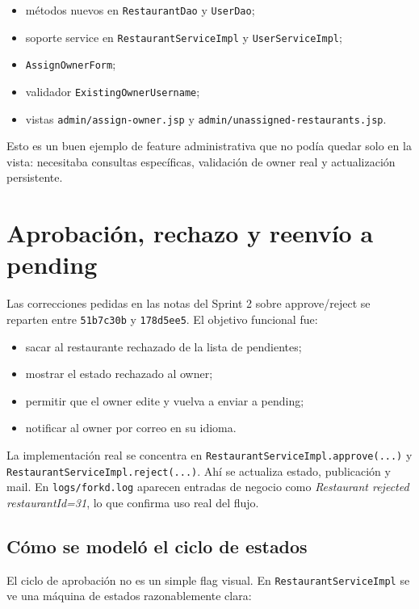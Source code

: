 \documentclass[11pt,a4paper]{report}
\newcommand{\commit}[1]{\texttt{#1}}
\newcommand{\code}[1]{\nolinkurl{#1}}
\begin{document}
\begin{itemize}
  \item m\'etodos nuevos en \code{RestaurantDao} y \code{UserDao};
  \item soporte service en \code{RestaurantServiceImpl} y \code{UserServiceImpl};
  \item \code{AssignOwnerForm};
  \item validador \code{ExistingOwnerUsername};
  \item vistas \code{admin/assign-owner.jsp} y \code{admin/unassigned-restaurants.jsp}.
\end{itemize}

Esto es un buen ejemplo de feature administrativa que no pod\'ia quedar solo en la vista: necesitaba consultas espec\'ificas, validaci\'on de owner real y actualizaci\'on persistente.

\section{Aprobaci\'on, rechazo y reenv\'io a pending}

Las correcciones pedidas en las notas del Sprint 2 sobre approve/reject se reparten entre \commit{51b7c30b} y \commit{178d5ee5}. El objetivo funcional fue:

\begin{itemize}
  \item sacar al restaurante rechazado de la lista de pendientes;
  \item mostrar el estado rechazado al owner;
  \item permitir que el owner edite y vuelva a enviar a pending;
  \item notificar al owner por correo en su idioma.
\end{itemize}

La implementaci\'on real se concentra en \code{RestaurantServiceImpl.approve(...)} y \code{RestaurantServiceImpl.reject(...)}. Ah\'i se actualiza estado, publicaci\'on y mail. En \code{logs/forkd.log} aparecen entradas de negocio como \emph{Restaurant rejected restaurantId=31}, lo que confirma uso real del flujo.

\subsection{C\'omo se model\'o el ciclo de estados}

El ciclo de aprobaci\'on no es un simple flag visual. En \code{RestaurantServiceImpl} se ve una m\'aquina de estados razonablemente clara:
\end{document}
